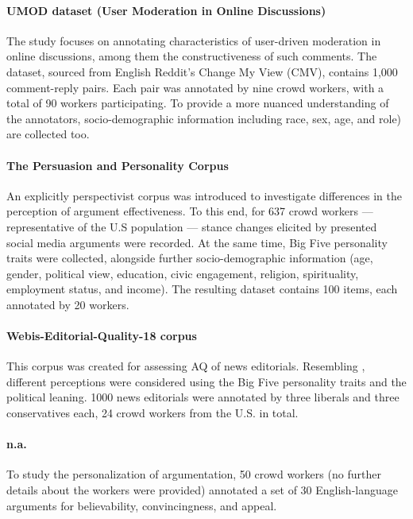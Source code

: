 \paragraph{UMOD dataset (User Moderation in Online Discussions) \cite{falk-etal-2024-moderation}}
The study focuses on annotating characteristics of user-driven moderation in online discussions, among them the constructiveness of such comments. The dataset, sourced from English Reddit's Change My View (CMV), contains 1,000 comment-reply pairs. Each pair was annotated by nine crowd workers, with a total of 90 workers participating. To provide a more nuanced understanding of the annotators, socio-demographic information including race, sex, age, and role) are collected too.


\paragraph{The Persuasion and Personality Corpus \cite{lukin-etal-2017-argument}}
An explicitly perspectivist corpus was introduced to investigate differences in the perception of argument effectiveness. To this end, for 637 crowd workers --- representative of the U.S population --- stance changes elicited by presented social media arguments were recorded. At the same time, Big Five personality traits were collected, alongside further socio-demographic information (age, gender, political view, education, civic engagement, religion, spirituality, employment status, and income). The resulting dataset contains 100 items, each annotated by 20 workers.

\paragraph{Webis-Editorial-Quality-18 corpus \cite{el-baff-etal-2018-challenge}}
This corpus was created for assessing AQ of news editorials. 
Resembling \citet{lukin-etal-2017-argument}, different perceptions were considered using the Big Five personality traits and the political leaning. 1000 news editorials were annotated by three liberals and three conservatives each, 24 crowd workers from the U.S. in total.


\paragraph{n.a. \cite{hunter2017empirical}}
To study the personalization of argumentation, 50 crowd workers (no further details about the workers were provided) annotated a set of 30 English-language arguments for believability, convincingness, and appeal.

